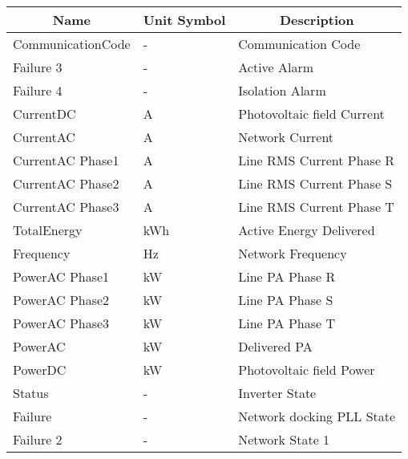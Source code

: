 \begin{table}[H]
	\begin{center}
		\begin{tabular}[c]{l|l|l}
			\hline
			\multicolumn{1}{c|}{\textbf{Name}}        &
			\multicolumn{1}{c|}{\textbf{Unit Symbol}} &
			\multicolumn{1}{c}{\textbf{Description}}                                         \\
			\hline
			CommunicationCode                         & -   & Communication Code             \\
			Failure 3                                 & -   & Active Alarm                 \\
			Failure 4                                 & -   & Isolation Alarm          \\
			CurrentDC                                 & A   & Photovoltaic field Current \\
			CurrentAC                                 & A   & Network Current               \\
			CurrentAC Phase1                          & A   & Line RMS Current Phase R   \\
			CurrentAC Phase2                          & A   & Line RMS Current Phase S   \\
			CurrentAC Phase3                          & A   & Line RMS Current Phase T   \\
			TotalEnergy                               & kWh & Active Energy Delivered         \\
			Frequency                                 & Hz  & Network Frequency              \\
			PowerAC Phase1                            & kW  & Line PA Phase R             \\
			PowerAC Phase2                            & kW  & Line PA Phase S             \\
			PowerAC Phase3                            & kW  & Line PA Phase T             \\
			PowerAC                                   & kW  & Delivered PA                   \\
			PowerDC                                   & kW  & Photovoltaic field Power  \\
			Status                                    & -   & Inverter State                 \\
			Failure                                   & -   & Network docking PLL State     \\
			Failure 2                                 & -   & Network State 1                   \\

\end{tabular}
\end{center}
\end{table}

